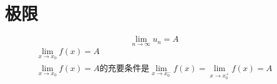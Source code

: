 \documentclass{ctexart}
\begin{document}
\section{极限}
\begin{equation*}
\lim_{n \to \infty} u_n = A
\end{equation*}
\begin{gather*}
\lim_{x \to x_0} f(x) = A \\
\lim_{x \to x_0} f(x) = A \text{的充要条件是}\lim_{x \to x_0^-} f(x) = \lim_{x \to x_0^+} f(x) = A
\end{gather*}
\end{document}
